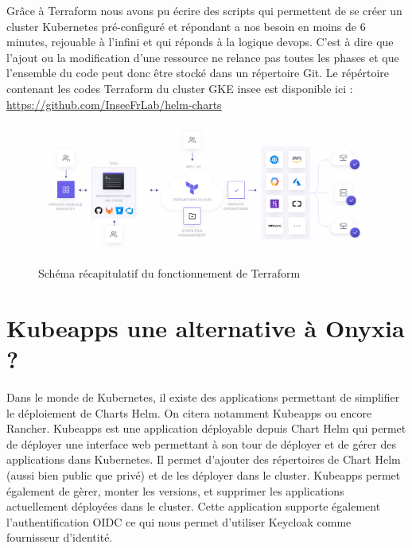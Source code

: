 \documentclass[11pt,fleqn]{book} %
\begin{document}
Grâce à Terraform nous avons pu écrire des scripts qui permettent de se créer un cluster Kubernetes pré-configuré et répondant a nos besoin en moins de 6 minutes, rejouable à l'infini et qui réponds à la logique devops. C'est à dire que l'ajout ou la modification d'une ressource ne relance pas toutes les phases et que l'ensemble du code peut donc être stocké dans un répertoire Git. Le répértoire contenant les codes Terraform du cluster GKE insee est disponible ici : \url{https://github.com/InseeFrLab/helm-charts}

\begin{figure}[H]\centering
\renewcommand{\figurename}{Schéma}
\includegraphics[angle=90, scale=0.35]{Pictures/annexe/terraform-cloud.png}
\captionsetup{margin=1.5cm,format=hang,justification=justified}
\caption[]{Schéma récapitulatif du fonctionnement de Terraform \newline}
\end{figure}




\chapter{Kubeapps une alternative à Onyxia ?}
\label{kubeapps}
\vspace{-2cm}
Dans le monde de Kubernetes, il existe des applications permettant de simplifier le déploiement de Charts Helm. On citera notamment Kubeapps ou encore Rancher. Kubeapps est une application déployable depuis Chart Helm qui permet de déployer une interface web permettant à son tour de déployer et de gérer des applications dans Kubernetes. Il permet d'ajouter des répertoires de Chart Helm (aussi bien public que privé) et de les déployer dans le cluster. Kubeapps permet également de gèrer, monter les versions, et supprimer les applications actuellement déployées dans le cluster. Cette application supporte également l'authentification OIDC ce qui nous permet d'utiliser Keycloak comme fournisseur d'identité.
\end{document}

